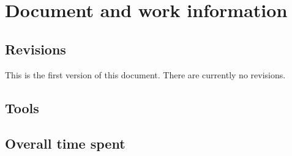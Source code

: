 \chapter{Document and work information}

\section{Revisions}
This is the first version of this document. There are currently no revisions.

\section{Tools}

\section{Overall time spent}
